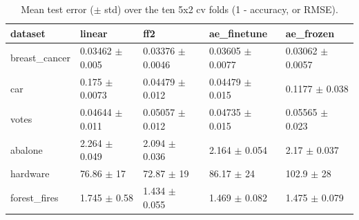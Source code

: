 \begin{table}
\caption{Mean test error ($\pm$ std) over the ten 5x2 cv folds (1 - accuracy, or RMSE).}
\label{tab:error}
\begin{tabular}{lllll}
\toprule
dataset & linear & ff2 & ae\_finetune & ae\_frozen \\
\midrule
breast\_cancer & 0.03462 $\pm$ 0.005 & 0.03376 $\pm$ 0.0046 & 0.03605 $\pm$ 0.0077 & 0.03062 $\pm$ 0.0057 \\
car & 0.175 $\pm$ 0.0073 & 0.04479 $\pm$ 0.012 & 0.04479 $\pm$ 0.015 & 0.1177 $\pm$ 0.038 \\
votes & 0.04644 $\pm$ 0.011 & 0.05057 $\pm$ 0.012 & 0.04735 $\pm$ 0.015 & 0.05565 $\pm$ 0.023 \\
abalone & 2.264 $\pm$ 0.049 & 2.094 $\pm$ 0.036 & 2.164 $\pm$ 0.054 & 2.17 $\pm$ 0.037 \\
hardware & 76.86 $\pm$ 17 & 72.87 $\pm$ 19 & 86.17 $\pm$ 24 & 102.9 $\pm$ 28 \\
forest\_fires & 1.745 $\pm$ 0.58 & 1.434 $\pm$ 0.055 & 1.469 $\pm$ 0.082 & 1.475 $\pm$ 0.079 \\
\bottomrule
\end{tabular}
\end{table}

